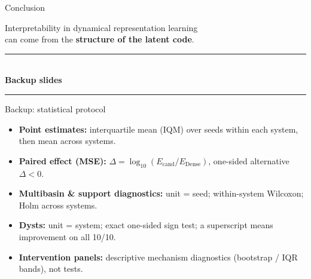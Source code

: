 \documentclass[aspectratio=169,10pt]{beamer}
\newcommand{\emphp}[1]{{\color{skaepurple}\bfseries #1}}
\newcommand{\statement}[1]{\vfill\begin{center}\Large\color{skaeink}#1\end{center}\vfill}
\begin{document}
\begin{frame}{Conclusion}
  \statement{Interpretability in dynamical representation learning\\ can come from the \emphp{structure of the latent code}.}
\end{frame}

\appendix
\begin{frame}[plain]
  \centering\vfill
  {\color{skaeblue}\rule{0.4\textwidth}{1.2pt}}\\[0.7em]
  {\Large\bfseries\color{skaeink} Backup slides}\\[0.6em]
  {\color{skaeblue}\rule{0.4\textwidth}{1.2pt}}
  \vfill
\end{frame}

\begin{frame}{Backup: statistical protocol}
  \vfill
  \begin{itemize}\setlength\itemsep{0.7em}
    \item \textbf{Point estimates:} interquartile mean (IQM) over seeds within each system, then mean across systems.
    \item \textbf{Paired effect (MSE):} $\Delta=\log_{10}(E_{\text{cand}}/E_{\text{Dense}})$, one-sided alternative $\Delta<0$.
    \item \textbf{Multibasin \& support diagnostics:} unit = seed; within-system Wilcoxon; Holm across systems.
    \item \textbf{Dysts:} unit = system; exact one-sided sign test; a superscript means improvement on all 10/10.
    \item \textbf{Intervention panels:} descriptive mechanism diagnostics (bootstrap / IQR bands), not tests.
  \end{itemize}
  \vfill
\end{frame}
\end{document}

